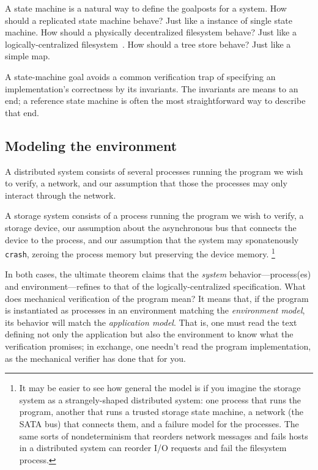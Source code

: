 A state machine is a natural way to define the goalposts for a system.
How should a replicated state machine behave?
Just like a instance of single state machine.
How should a physically decentralized filesystem behave?
Just like a logically-centralized filesystem~\cite{Farsite}.
How should a {\bepsilon}tree store behave?
Just like a simple map.

A state-machine goal avoids a common verification trap of specifying
an implementation's correctness by its invariants. The invariants are
means to an end; a reference state machine is often the most straightforward
way to describe that end.

\subsection{Modeling the environment}

A distributed system consists of several processes running
the program we wish to verify,
a network,
and our assumption that those the processes may only interact through
the network.

A storage system consists of a process running the program
we wish to verify,
a storage device,
our assumption about the asynchronous bus that connects the
device to the process,
and our assumption that the system may sponatenously \texttt{crash},
zeroing the process memory but preserving the device memory.
\footnote{
It may be easier to see how general the model is if you imagine
the storage system as a strangely-shaped distributed system:
one process that runs the program,
another that runs a trusted storage state machine,
a network (the SATA bus) that connects them,
and a failure model for the processes.
The same sorts of nondeterminism that reorders network messages and fails
hosts in a distributed system
can reorder I/O requests and fail the filesystem process.
}

In both cases, the ultimate theorem claims that the
\textit{system} behavior---process(es) and environment---refines
to that of the logically-centralized specification.
What does mechanical verification of the program mean?
It means that, if the program is instantiated as processes in an
environment matching the \textit{environment model},
its behavior will match the \textit{application model}.
That is, one must read the text defining not only the application
but also the environment to know what the verification promises;
in exchange, one needn't read the program implementation, as the
mechanical verifier has done that for you.

